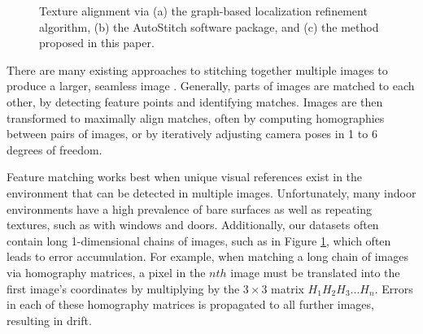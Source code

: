 \documentclass[]{spie}  %
\begin{document}
\begin{figure}
  \centering {}

  \centering {}

  \centering {}

  \caption{Texture alignment via (a) the graph-based localization
    refinement algorithm, (b) the AutoStitch software package, and (c)
    the method proposed in this paper.}
  \label{fig:mosaic3D}
\end{figure}

There are many existing approaches to stitching together multiple
images to produce a larger, seamless image \cite{szeliski2006image,
  agarwalapanoramas, wangmultipleviews, coorg1997matching,
  debevechybrid, bernardinimultiplescans}. Generally, parts of images
are matched to each other, by detecting feature points and identifying
matches. Images are then transformed to maximally align matches,
often by computing homographies between pairs of images, or by
iteratively adjusting camera poses in 1 to 6 degrees of freedom.

Feature matching works best when unique visual references exist in the
environment that can be detected in multiple images. Unfortunately,
many indoor environments have a high prevalence of bare surfaces as
well as repeating textures, such as with windows and
doors. Additionally, our datasets often contain long 1-dimensional
chains of images, such as in Figure \ref{fig:mosaic3D}, which often
leads to error accumulation. For example, when matching a long chain
of images via homography matrices, a pixel in the $nth$ image must be
translated into the first image's coordinates by multiplying by the
$3\times3$ matrix $H_1 H_2 H_3 ... H_n$. Errors in each of these
homography matrices is propagated to all further images, resulting in
drift.
\end{document}
